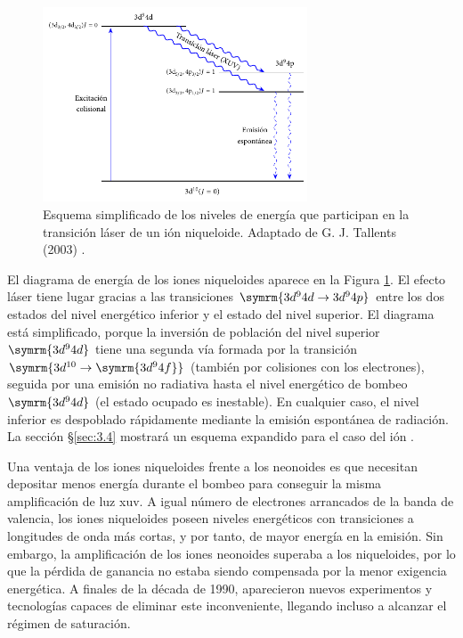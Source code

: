 \begin{figure}[htbp]
  \centering
  \includegraphics[width=0.7\textwidth]{Figuras/ch1_niquel_like.pdf}
  \caption{Esquema simplificado de los niveles de energía que participan en la transición láser de un ión niqueloide. Adaptado de G. J. Tallents (2003) \autocite{Tallents2003}.}
  \label{fig:1.23}
\end{figure}

El diagrama de energía de los iones niqueloides aparece en la Figura \ref{fig:1.23}. El efecto láser tiene lugar gracias a las transiciones $\symrm{3d^{9}4d \rightarrow 3d^{9}4p}$ entre los dos estados del nivel energético inferior y el estado del nivel superior. El diagrama está simplificado, porque la inversión de población del nivel superior $\symrm{3d^{9}4d}$ tiene una segunda vía formada por la transición $\symrm{3d^{10} \rightarrow \symrm{3d^{9}4f}}$ (también por colisiones con los electrones), seguida por una emisión no radiativa hasta el nivel energético de bombeo $\symrm{3d^{9}4d}$ (el estado ocupado es inestable). En cualquier caso, el nivel inferior es despoblado rápidamente mediante la emisión espontánea de radiación. La sección \S\ref{sec:3.4} mostrará un esquema expandido para el caso del ión .

Una ventaja de los iones niqueloides frente a los neonoides es que necesitan depositar menos energía durante el bombeo para conseguir la misma amplificación de luz \acrshort{xuv}. A igual número de electrones arrancados de la banda de valencia, los iones niqueloides poseen niveles energéticos con transiciones a longitudes de onda más cortas, y por tanto, de mayor energía en la emisión. Sin embargo, la amplificación de los iones neonoides superaba a los niqueloides, por lo que la pérdida de ganancia no estaba siendo compensada por la menor exigencia energética. A finales de la década de 1990, aparecieron nuevos experimentos y tecnologías capaces de eliminar este inconveniente, llegando incluso a alcanzar el régimen de saturación. 

